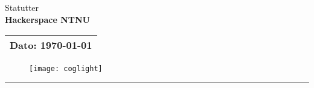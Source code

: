 \documentclass[a4paper, 11pt, norsk]{article}
\begin{document}

\begin{centering}
\huge
Statutter\\
\vspace{1ex}
 \huge \textbf{
 Hackerspace NTNU
}\\
\vspace{1ex}
\Large
\vspace{3ex}

\normalsize
\begin{tabular}{c}
\toprule
Dato: \today \\
\bottomrule
\end{tabular}

\bigskip
\begin{figure}[ht]
  \centering
  \texttt{[image: coglight]}\label{fig:logo}
\end{figure}

\end{centering}



\newpage
\setlength{\parskip}{0ex}
\renewcommand{\baselinestretch}{0.1}\normalsize
{}
\tableofcontents
\singlespacing{}
\renewcommand{\baselinestretch}{1.00}\normalsize
\setlength{\parskip}{2ex}
\rule{\textwidth}{1pt}



\newpage




\end{document}
